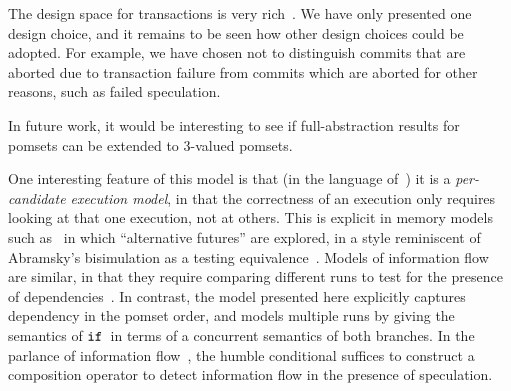 
The design space for transactions is very rich~\cite{DBLP:journals/pacmpl/DongolJR18}.
We have only presented one design choice, and it remains to be seen how other
design choices could be adopted. For example, we have chosen not to distinguish
commits that are aborted due to transaction failure from commits which are aborted
for other reasons, such as failed speculation.

In future work, it would be interesting to see if full-abstraction
results for pomsets \cite{Plotkin:1997:TSP:266557.266600} can be extended to
3-valued pomsets.

One interesting feature of this model is that (in the language
of~\cite{Pichon-Pharabod:2016:CSR:2837614.2837616}) it is a
\emph{per-candidate execution model}, in that the correctness of an
execution only requires looking at that one execution, not at
others. This is explicit in memory models such
as~\cite{Jagadeesan:2010:GOS:2175486.2175503,Kang-promising-2017} in which
``alternative futures'' are explored, in a style reminiscent of
Abramsky's bisimulation as a testing equivalence~\cite{ABRAMSKY1987225}. Models of
information flow are similar, in that they require comparing different
runs to test for the presence of dependencies~\cite{Clarkson:2010:HYP:1891823.1891830}. In contrast, the model
presented here explicitly captures dependency in the pomset order, and
models multiple runs by giving the semantics of $\texttt{if}\,$ in terms of a
concurrent semantics of both branches.
In the parlance of information flow~\cite{Barthe:2004:SIF:1009380.1009669},
the humble conditional suffices to construct a composition operator to detect information flow  in the presence of speculation.
